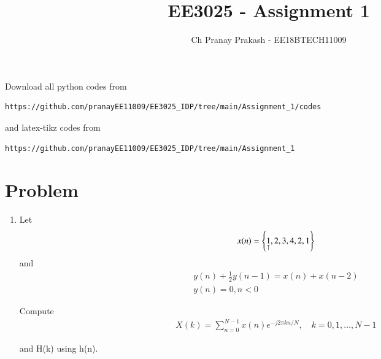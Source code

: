 \documentclass[journal,12pt,twocolumn]{IEEEtran}
\renewcommand\thesection{\arabic{section}}
\begin{document}
     \def\rightbox#1{\makebox[0in][r]{#1}}
     \def\centbox#1{\makebox[0in]{#1}}
     \def\topbox#1{\raisebox{-\baselineskip}[0in][0in]{#1}}
     \def\midbox#1{\raisebox{-0.5\baselineskip}[0in][0in]{#1}}
\vspace{3cm}
\title{EE3025 - Assignment 1}
\author{Ch Pranay Prakash - EE18BTECH11009}
\maketitle
\newpage
\bigskip
\renewcommand{\thefigure}{\theenumi}
\renewcommand{\thetable}{\theenumi}
Download all python codes from 
\begin{lstlisting}
https://github.com/pranayEE11009/EE3025_IDP/tree/main/Assignment_1/codes
\end{lstlisting}
%
and latex-tikz codes from 
%
\begin{lstlisting}
https://github.com/pranayEE11009/EE3025_IDP/tree/main/Assignment_1
\end{lstlisting}
\section{Problem}
\begin{enumerate}[label=\thesection.\arabic*.,ref=\thesection.\theenumi]
\item
Let
\begin{align}
    x(n) = \left\{\underset{\uparrow}{1},2,3,4,2,1\right\} 
\end{align}
and 
\begin{multline}
    y(n) + \frac{1}{2}y(n-1) = x(n) + x(n-2) \label{eq:1.0.2}
    \\
    y(n) = 0 , n<0
\end{multline}

Compute
\begin{align}
    X(k) = \sum_{n=0}^{N-1}x(n)e^{-j2\pi kn/N},
    \quad k=0,1, \ldots, N-1
\end{align}

and H(k) using h(n).\\
\end{enumerate}
\end{document}
